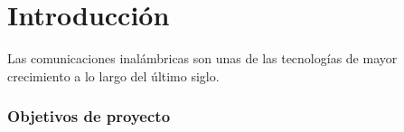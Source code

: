 \chapter{Introducción}

Las comunicaciones inalámbricas son unas de las tecnologías de mayor crecimiento a lo largo del último siglo.

\subsection{Objetivos de proyecto}\label{subc:objetivos}